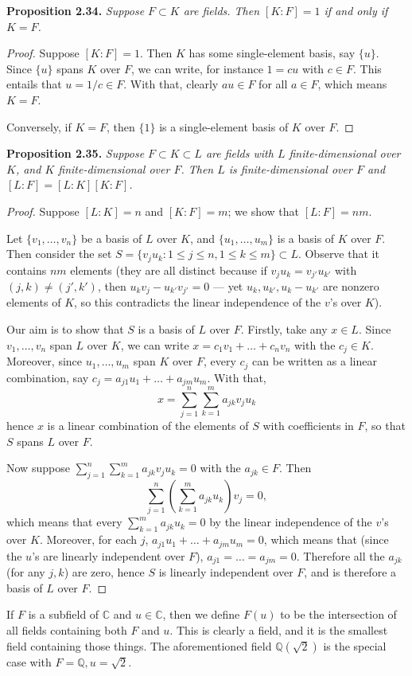 \documentclass[leqno]{book}
\begin{document}
\noindent\textbf{Proposition 2.34.} \emph{Suppose $F\subset K$ are fields.  Then $[K:F]=1$ if and only if $K=F$.}
\begin{proof}
Suppose $[K:F]=1$.  Then $K$ has some single-element basis, say $\{u\}$.  Since $\{u\}$ spans $K$ over $F$, we can write, for instance $1=cu$ with $c\in F$.  This entails that $u=1/c\in F$.  With that, clearly $au\in F$ for all $a\in F$, which means $K=F$.

Conversely, if $K=F$, then $\{1\}$ is a single-element basis of $K$ over $F$.
\end{proof}
\noindent\textbf{Proposition 2.35.} \emph{Suppose $F\subset K\subset L$ are fields with $L$ finite-dimensional over $K$, and $K$ finite-dimensional over $F$.  Then $L$ is finite-dimensional over $F$ and $[L:F]=[L:K][K:F]$.}
\begin{proof}
Suppose $[L:K]=n$ and $[K:F]=m$; we show that $[L:F]=nm$.

Let $\{v_1,\dots,v_n\}$ be a basis of $L$ over $K$, and $\{u_1,\dots,u_m\}$ is a basis of $K$ over $F$.  Then consider the set $S=\{v_ju_k:1\leqslant j\leqslant n,1\leqslant k\leqslant m\}\subset L$.  Observe that it contains $nm$ elements (they are all distinct because if $v_ju_k=v_{j'}u_{k'}$ with $(j,k)\ne(j',k')$, then $u_kv_j-u_{k'}v_{j'}=0$ \---- yet $u_k,u_{k'},u_k-u_{k'}$ are nonzero elements of $K$, so this contradicts the linear independence of the $v$'s over $K$).

Our aim is to show that $S$ is a basis of $L$ over $F$.  Firstly, take any $x\in L$.  Since $v_1,\dots,v_n$ span $L$ over $K$, we can write $x=c_1v_1+\dots+c_nv_n$ with the $c_j\in K$.  Moreover, since $u_1,\dots,u_m$ span $K$ over $F$, every $c_j$ can be written as a linear combination, say $c_j=a_{j1}u_1+\dots+a_{jm}u_m$.  With that,
$$x=\sum_{j=1}^n\sum_{k=1}^m a_{jk}v_ju_k$$
hence $x$ is a linear combination of the elements of $S$ with coefficients in $F$, so that $S$ spans $L$ over $F$.

Now suppose $\sum_{j=1}^n\sum_{k=1}^m a_{jk}v_ju_k=0$ with the $a_{jk}\in F$.  Then
$$\sum_{j=1}^n\left(\sum_{k=1}^m a_{jk}u_k\right)v_j=0,$$
which means that every $\sum_{k=1}^m a_{jk}u_k=0$ by the linear independence of the $v$'s over $K$.  Moreover, for each $j$, $a_{j1}u_1+\dots+a_{jm}u_m=0$, which means that (since the $u$'s are linearly independent over $F$), $a_{j1}=\dots=a_{jm}=0$.  Therefore all the $a_{jk}$ (for any $j,k$) are zero, hence $S$ is linearly independent over $F$, and is therefore a basis of $L$ over $F$.
\end{proof}
\noindent If $F$ is a subfield of $\mathbb C$ and $u\in\mathbb C$, then we define $F(u)$ to be the intersection of all fields containing both $F$ and $u$.  This is clearly a field, and it is the smallest field containing those things.  The aforementioned field $\mathbb Q(\sqrt 2)$ is the special case with $F=\mathbb Q,u=\sqrt 2$.
\end{document}
